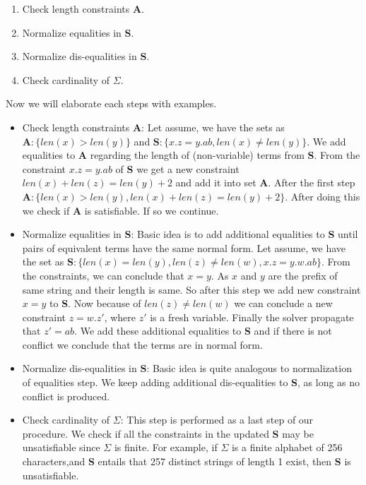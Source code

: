   	\begin{enumerate}
   		\item Check length constraints \( \textbf{A}\). 
   		\item Normalize equalities in \( \textbf{S}\).   		
   		\item Normalize dis-equalities in \( \textbf{S}\). 
   		\item Check cardinality of \( \Sigma\). 
   	\end{enumerate}
   	Now we will elaborate each steps with examples. 
   	\begin{itemize}
   		\item Check length constraints \( \textbf{A}\): Let assume, we have the sets as \(  \textbf{A} : \{ len(x) > len(y) \}  \) and \(  \textbf{S} : \{  x.z = y.ab, len(x) \neq len(y) \}  \). We add equalities to \textbf{A} regarding the length of (non-variable) terms from \textbf{S}. From the constraint \(   x.z = y.ab\) of  \textbf{S} we get a new constraint \( len(x) + len(z) =  len(y) + 2 \) and add it into set \textbf{A}. After the first step \(  \textbf{A} : \{ len(x) > len(y), len(x) + len(z) =  len(y) + 2 \}  \). After doing this we check if  \textbf{A} is satisfiable. If so we continue.   
   		
   		 
   		\item Normalize equalities in \( \textbf{S}\): Basic idea is to add additional equalities to \textbf{S} until pairs of equivalent terms have the same normal form. Let assume, we have the set as  \(  \textbf{S} : \{  len(x) = len(y), len(z) \neq len(w), x.z = y.w.ab \}  \). From the constraints, we can conclude that \(  x = y\). As \(x\) and  \(y\) are the prefix of same string and their length is same. So after this step we add new constraint \(x = y\) to  \textbf{S}. Now because of  \(len(z) \neq len(w) \) we can conclude a new constraint \( z = w.z'\), where \(z'\) is a fresh variable. Finally the solver propagate that \( z' = ab\). We add these additional equalities to \textbf{S} and if there is not conflict we conclude that the terms are in normal form.
   		
   		\item Normalize dis-equalities in \( \textbf{S}\): Basic idea is quite analogous to normalization of equalities step. We keep adding additional dis-equalities to \textbf{S}, as long as no conflict is produced. 
   		
   		\item Check cardinality of \( \Sigma\): This step is performed as a last step of our procedure. We check if all the constraints in the updated \textbf{S} may be unsatisfiable since \( \Sigma\) is finite. For example, if \( \Sigma\) is a finite alphabet of 256 characters,and \textbf{S} entails that 257 distinct strings of length 1 exist, then \textbf{S} is unsatisfiable. 
   		      		  
   	\end{itemize}  
   	